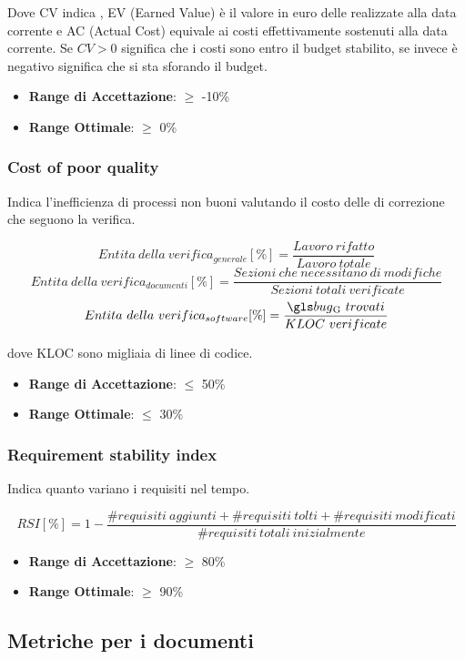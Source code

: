 \documentclass[12pt,a4paper]{article}
\begin{document}
Dove CV indica , EV (Earned Value) è il valore in euro delle  realizzate alla data corrente e AC (Actual Cost) equivale ai costi effettivamente sostenuti alla data corrente. Se $CV > 0$ significa che i costi sono entro il budget stabilito, se invece è negativo significa che si sta sforando il budget.

\begin{itemize}
\item \textbf{Range di Accettazione}: $\geq$ -10\%
\item \textbf{Range Ottimale}: $\geq$ 0\%
\end{itemize}

\subsubsection{Cost of poor quality}
Indica l'inefficienza di processi non buoni valutando il costo delle  di correzione che seguono la verifica.

\[Entita\ della\ verifica_{generale}[\%]= \frac{Lavoro\ rifatto}{Lavoro\ totale}\]
\[Entita\ della\ verifica_{documenti}[\%]= \frac{Sezioni\ che\ necessitano\ di\ modifiche}{Sezioni\ totali\ verificate}\]
\[Entita\ della\ verifica_{software}[\%]= \frac{\mgls{bug}\ trovati}{KLOC\ verificate}\]
	
dove KLOC sono migliaia di linee di codice.

\begin{itemize}
	\item \textbf{Range di Accettazione}: $\leq$ 50\%
	\item \textbf{Range Ottimale}: $\leq$ 30\%
\end{itemize}

\subsubsection{Requirement stability index}
Indica quanto variano i requisiti nel tempo.

\[RSI[\%]= 1 - \frac{\#requisiti\ aggiunti+\#requisiti\ tolti+\#requisiti\ modificati}{\#requisiti\ totali\ inizialmente}\]

\begin{itemize}
	\item \textbf{Range di Accettazione}: $\geq$ 80\%
	\item \textbf{Range Ottimale}: $\geq$ 90\%
\end{itemize}

\subsection{Metriche per i documenti}\label{metriche_doc}
\end{document}
